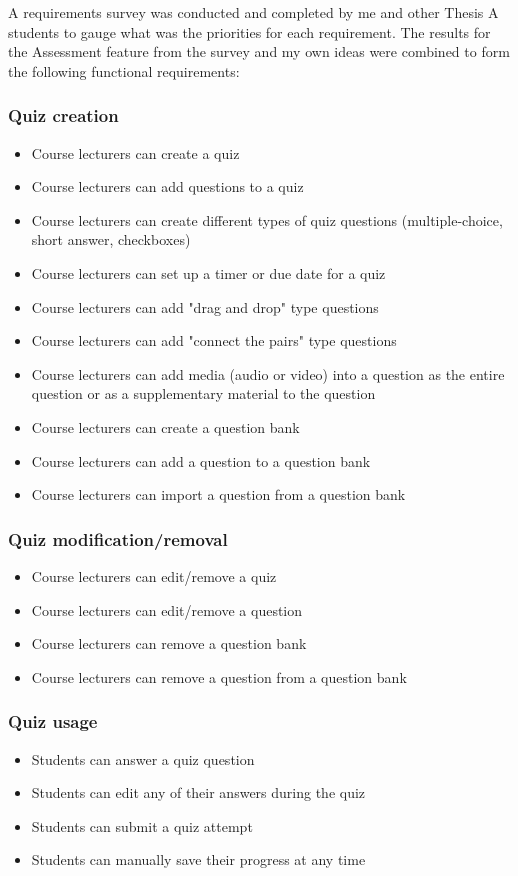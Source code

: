 A requirements survey was conducted and completed by me and other Thesis A students to gauge what was the priorities for each requirement. The results for the Assessment feature from the survey and my own ideas were combined to form the following functional requirements:

\subsubsection{Quiz creation}
\begin{itemize}
	\item Course lecturers can create a quiz
	\item Course lecturers can add questions to a quiz
	\item Course lecturers can create different types of quiz questions (multiple-choice, short answer, checkboxes)
	\item Course lecturers can set up a timer or due date for a quiz
	\item Course lecturers can add "drag and drop" type questions
	\item Course lecturers can add "connect the pairs" type questions
	\item Course lecturers can add media (audio or  video) into a question as the entire question or as a supplementary material to the question
	\item Course lecturers can create a question bank
	\item Course lecturers can add a question to a question bank
	\item Course lecturers can import a question from a question bank
\end{itemize}

\subsubsection{Quiz modification/removal}
\begin{itemize}
	\item Course lecturers can edit/remove a quiz
	\item Course lecturers can edit/remove a question
	\item Course lecturers can remove a question bank
	\item Course lecturers can remove a question from a question bank
\end{itemize}

\subsubsection{Quiz usage}
\begin{itemize}
	\item Students can answer a quiz question
	\item Students can edit any of their answers during the quiz
	\item Students can submit a quiz attempt
	\item Students can manually save their progress at any time
\end{itemize}

